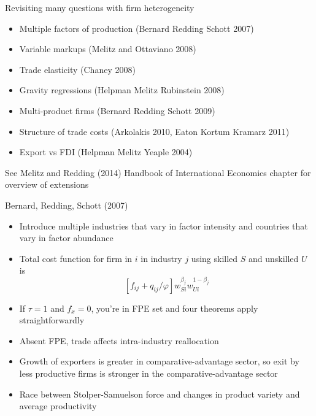 \documentclass[10pt,notes=hide]{beamer}
\begin{document}
\begin{frame}{Revisiting many questions with firm heterogeneity }
\begin{itemize}
\item Multiple factors of production (Bernard Redding Schott 2007)
\item Variable markups (Melitz and Ottaviano 2008)
\item Trade elasticity (Chaney 2008)
\item Gravity regressions (Helpman Melitz Rubinstein 2008)
\item Multi-product firms (Bernard Redding Schott 2009)
\item Structure of trade costs (Arkolakis 2010, Eaton Kortum Kramarz 2011)
\item Export vs FDI (Helpman Melitz Yeaple 2004)
\end{itemize}
See Melitz and Redding (2014) Handbook of International Economics chapter for overview of extensions
\end{frame}
\begin{frame}{Bernard, Redding, Schott (2007)}
\begin{itemize}
	\item Introduce multiple industries that vary in factor intensity and countries that vary in factor abundance
	\item Total cost function for firm in $i$ in industry $j$ using skilled $S$ and unskilled $U$ is
	$$
	\left[f_{ij}+q_{ij}/\varphi\right] w_{Si}^{\beta_j} w_{Ui}^{1-\beta_j}
	$$
	\item If $\tau=1$ and $f_x=0$, you're in FPE set and four theorems apply straightforwardly
	\item Absent FPE, trade affects intra-industry reallocation
	\item Growth of exporters is greater in comparative-advantage sector,
	so exit by less productive firms is stronger in the comparative-advantage sector
	\item Race between Stolper-Samuelson force and changes in product variety and average productivity
\end{itemize}
\end{frame}
\end{document}
